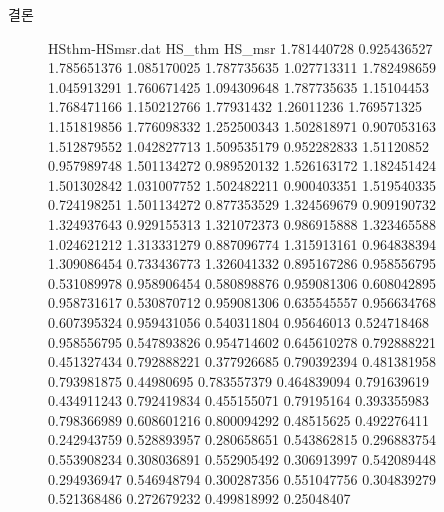 \documentclass[Junlampaper, portrait]{Julam_PosterK}
\begin{document}
\begin{poster}
\begin{posterbox}[name=result,column=3,]{결론  }
    \begin{figure}[H]
        \begin{filecontents}{HSthm-HSmsr.dat}
                HS_thm	HS_msr
                1.781440728	0.925436527
                1.785651376	1.085170025
                1.787735635	1.027713311
                1.782498659	1.045913291
                1.760671425	1.094309648
                1.787735635	1.15104453
                1.768471166	1.150212766
                1.77931432	1.26011236
                1.769571325	1.151819856
                1.776098332	1.252500343
                1.502818971	0.907053163
                1.512879552	1.042827713
                1.509535179	0.952282833
                1.51120852	0.957989748
                1.501134272	0.989520132
                1.526163172	1.182451424
                1.501302842	1.031007752
                1.502482211	0.900403351
                1.519540335	0.724198251
                1.501134272	0.877353529
                1.324569679	0.909190732
                1.324937643	0.929155313
                1.321072373	0.986915888
                1.323465588	1.024621212
                1.313331279	0.887096774
                1.315913161	0.964838394
                1.309086454	0.733436773
                1.326041332	0.895167286
                0.958556795	0.531089978
                0.958906454	0.580898876
                0.959081306	0.608042895
                0.958731617	0.530870712
                0.959081306	0.635545557
                0.956634768	0.607395324
                0.959431056	0.540311804
                0.95646013	0.524718468
                0.958556795	0.547893826
                0.954714602	0.645610278
                0.792888221	0.451327434
                0.792888221	0.377926685
                0.790392394	0.481381958
                0.793981875	0.44980695
                0.783557379	0.464839094
                0.791639619	0.434911243
                0.792419834	0.455155071
                0.79195164	0.393355983
                0.798366989	0.608601216
                0.800094292	0.48515625
                0.492276411	0.242943759
                0.528893957	0.280658651
                0.543862815	0.296883754
                0.553908234	0.308036891
                0.552905492	0.306913997
                0.542089448	0.294936947
                0.546948794	0.300287356
                0.551047756	0.304839279
                0.521368486	0.272679232
                0.499818992	0.25048407                  
            \end{filecontents}


\end{figure}
\end{posterbox}
\end{poster}
\end{document}

